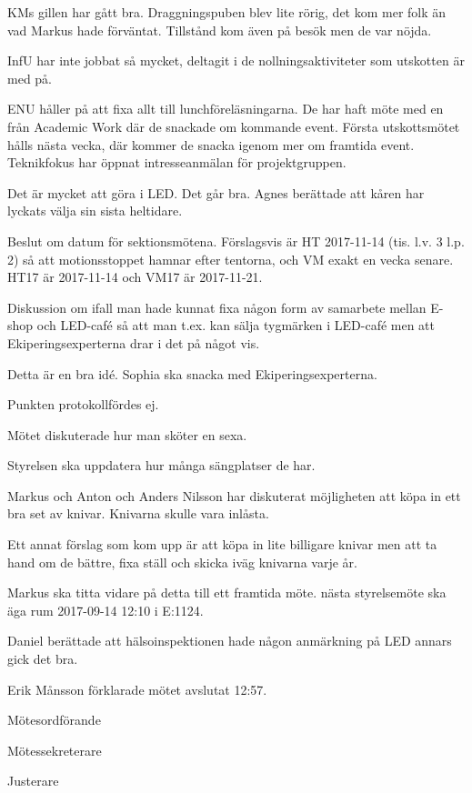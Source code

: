 \documentclass[10pt]{article}
\def\mo{Erik Månsson}
\def\ms{Johan Karlberg}
\def\ji{Edvard Carlsson}
\begin{document}
\begin{paragrafer}
\begin{paragrafer}
KMs gillen har gått bra. Draggningspuben blev lite rörig, det kom mer folk än vad Markus hade förväntat. Tillstånd kom även på besök men de var nöjda.

InfU har inte jobbat så mycket, deltagit i de nollningsaktiviteter som utskotten är med på.

ENU håller på att fixa allt till lunchföreläsningarna. De har haft möte med en från Academic Work där de snackade om kommande event. Första utskottsmötet hålls nästa vecka, där kommer de snacka igenom mer om framtida event. Teknikfokus har öppnat intresseanmälan för projektgruppen.

Det är mycket att göra i LED.
Det går bra.
Agnes berättade att kåren har lyckats välja sin sista heltidare.
\end{paragrafer}

Beslut om datum för sektionsmötena. Förslagsvis är HT 2017-11-14 (tis. l.v. 3 l.p. 2) så att motionsstoppet hamnar efter tentorna, och VM exakt en vecka senare.
\Mba HT17 är 2017-11-14 och VM17 är 2017-11-21.

Diskussion om ifall man hade kunnat fixa någon form av samarbete mellan E-shop och LED-café så att man t.ex. kan sälja tygmärken i LED-café men att Ekiperingsexperterna drar i det på något vis.

Detta är en bra idé. Sophia ska snacka med Ekiperingsexperterna.

Punkten protokollfördes ej.

Mötet diskuterade hur man sköter en sexa.

Styrelsen ska uppdatera hur många sängplatser de har.

Markus och Anton och Anders Nilsson har diskuterat möjligheten att köpa in ett bra set av knivar. Knivarna skulle vara inlåsta.

Ett annat förslag som kom upp är att köpa in lite billigare knivar men att ta hand om de bättre, fixa ställ och skicka iväg knivarna varje år.

Markus ska titta vidare på detta till ett framtida möte.
{\Mba} nästa styrelsemöte ska äga rum 2017-09-14 12:10 i E:1124.

{\Ibfu}

Daniel berättade att hälsoinspektionen hade någon anmärkning på LED annars gick det bra.

{\mo} förklarade mötet avslutat 12:57.

\end{paragrafer}

\hidesignfoot
\begin{signatures}{3}
\signature{\mo}{Mötesordförande}
\signature{\ms}{Mötessekreterare}
\signature{\ji}{Justerare}
\end{signatures}
\end{document}

